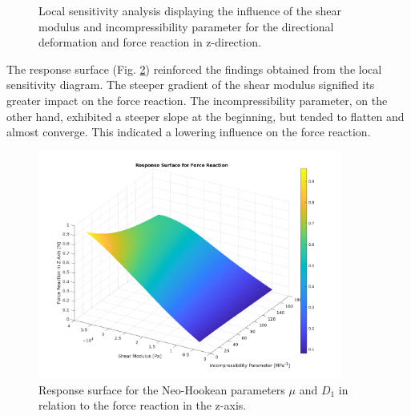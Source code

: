 \begin{figure}%
    \centering
	\caption[Local sensitivity analysis - Initial parameter range]{Local sensitivity analysis displaying the influence of the shear modulus and incompressibility parameter for the directional deformation and force reaction in z-direction.}%
	\label{fig:fullrangelocalsensi}%
 \end{figure}

The response surface (Fig. \ref{fig:rsoforce}) 
reinforced the findings obtained from the local sensitivity diagram. The steeper gradient of the shear modulus 
signified its greater impact on the force reaction. The incompressibility parameter, on the other hand, 
exhibited a steeper slope at the beginning, but tended to flatten and almost converge. This indicated 
a lowering influence on the force reaction.

\begin{figure}%
	\centering
   \quad
   \includegraphics[width=10cm]{Images/ifem/plat NH 4 and 2 fullrange/rsoforce1.png}%
   \caption[Response surface - Force reaction]{Response surface for the Neo-Hookean parameters $\mu$ and $D_1$ in relation to the force reaction in the z-axis.}%
   \label{fig:rsoforce}%
\end{figure}

